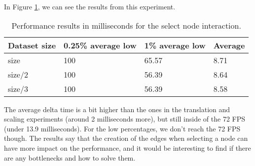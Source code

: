 %
%

In Figure \ref{tab:experiment_select}, we can see the results from this experiment.

\begin{table}[h!]
\centering
\begin{tabular}{llll}
  \hline
Dataset size & 0.25\% average low & 1\% average low & Average \\
\hline
size & 100 & 65.57 & 8.71 \\
size/2 & 100 & 56.39 & 8.64 \\
size/3 & 100 & 56.39 & 8.58 \\
\end{tabular}
\caption{Performance results in milliseconds for the select node interaction.}
\label{tab:experiment_select}
\end{table}

The average delta time is a bit higher than the ones in the translation and scaling experiments (around 2 milliseconds more), but still inside of the 72 FPS (under 13.9 milliseconds). For the low percentages, we don't reach the 72 FPS though. The results say that the creation of the edges when selecting a node can have more impact on the performance, and it would be interesting to find if there are any bottlenecks and how to solve them.

